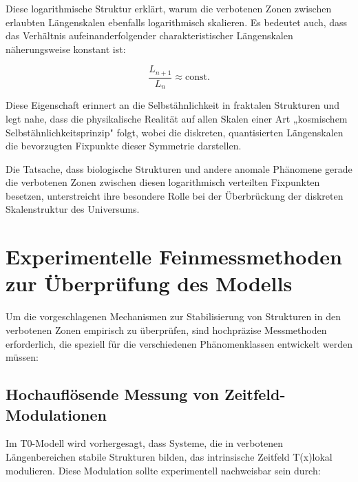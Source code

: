 \documentclass[12pt,a4paper]{article}
\newcommand{\Tfield}{T(x)}
\begin{document}
Diese logarithmische Struktur erklärt, warum die verbotenen Zonen zwischen erlaubten Längenskalen ebenfalls logarithmisch skalieren. Es bedeutet auch, dass das Verhältnis aufeinanderfolgender charakteristischer Längenskalen näherungsweise konstant ist:

\begin{equation}
	\frac{L_{n+1}}{L_n} \approx \text{const.}
\end{equation}

Diese Eigenschaft erinnert an die Selbstähnlichkeit in fraktalen Strukturen und legt nahe, dass die physikalische Realität auf allen Skalen einer Art „kosmischem Selbstähnlichkeitsprinzip" folgt, wobei die diskreten, quantisierten Längenskalen die bevorzugten Fixpunkte dieser Symmetrie darstellen.

Die Tatsache, dass biologische Strukturen und andere anomale Phänomene gerade die verbotenen Zonen zwischen diesen logarithmisch verteilten Fixpunkten besetzen, unterstreicht ihre besondere Rolle bei der Überbrückung der diskreten Skalenstruktur des Universums.
	
	\section{Experimentelle Feinmessmethoden zur Überprüfung des Modells}
	
	Um die vorgeschlagenen Mechanismen zur Stabilisierung von Strukturen in den verbotenen Zonen empirisch zu überprüfen, sind hochpräzise Messmethoden erforderlich, die speziell für die verschiedenen Phänomenklassen entwickelt werden müssen:
	
	\subsection{Hochauflösende Messung von Zeitfeld-Modulationen}
	
	Im T0-Modell wird vorhergesagt, dass Systeme, die in verbotenen Längenbereichen stabile Strukturen bilden, das intrinsische Zeitfeld \Tfield lokal modulieren. Diese Modulation sollte experimentell nachweisbar sein durch:
	
\end{document}
